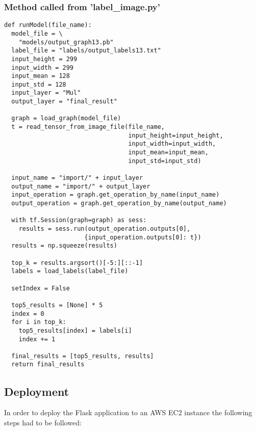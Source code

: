 \subsubsection*{Method called from 'label\_image.py'}
\begin{lstlisting}[style=Python]
def runModel(file_name):
  model_file = \
    "models/output_graph13.pb"
  label_file = "labels/output_labels13.txt"
  input_height = 299
  input_width = 299
  input_mean = 128
  input_std = 128
  input_layer = "Mul"
  output_layer = "final_result"

  graph = load_graph(model_file)
  t = read_tensor_from_image_file(file_name,
                                  input_height=input_height,
                                  input_width=input_width,
                                  input_mean=input_mean,
                                  input_std=input_std)

  input_name = "import/" + input_layer
  output_name = "import/" + output_layer
  input_operation = graph.get_operation_by_name(input_name)
  output_operation = graph.get_operation_by_name(output_name)

  with tf.Session(graph=graph) as sess:
    results = sess.run(output_operation.outputs[0],
                      {input_operation.outputs[0]: t})
  results = np.squeeze(results)

  top_k = results.argsort()[-5:][::-1]
  labels = load_labels(label_file)

  setIndex = False

  top5_results = [None] * 5
  index = 0
  for i in top_k:
    top5_results[index] = labels[i]
    index += 1

  final_results = [top5_results, results]
  return final_results
\end{lstlisting}

\subsection*{Deployment}
In order to deploy the Flask application to an AWS EC2 instance the following steps had to be followed:

